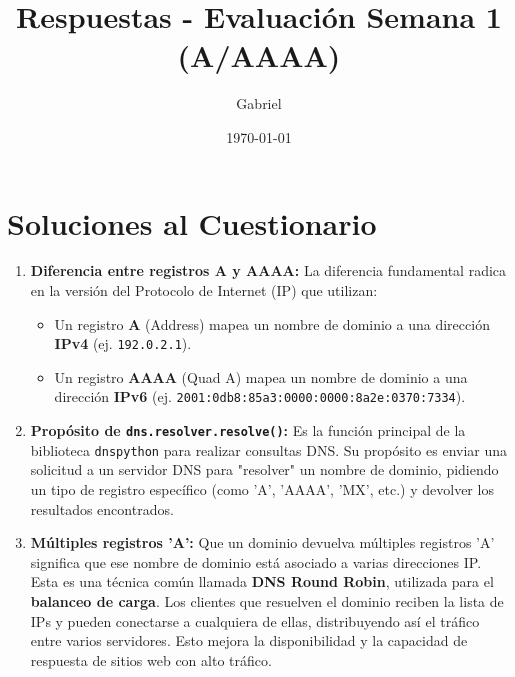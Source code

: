 \documentclass{article}
\title{Respuestas - Evaluación Semana 1 (A/AAAA)}
\author{Gabriel}
\date{\today}
\begin{document}
\maketitle

\section*{Soluciones al Cuestionario}

\begin{enumerate}
    \item \textbf{Diferencia entre registros A y AAAA:}
    La diferencia fundamental radica en la versión del Protocolo de Internet (IP) que utilizan:
    \begin{itemize}
        \item Un registro \textbf{A} (Address) mapea un nombre de dominio a una dirección \textbf{IPv4} (ej. \texttt{192.0.2.1}).
        \item Un registro \textbf{AAAA} (Quad A) mapea un nombre de dominio a una dirección \textbf{IPv6} (ej. \texttt{2001:0db8:85a3:0000:0000:8a2e:0370:7334}).
    \end{itemize}

    \item \textbf{Propósito de \texttt{dns.resolver.resolve()}:}
    Es la función principal de la biblioteca \texttt{dnspython} para realizar consultas DNS. Su propósito es enviar una solicitud a un servidor DNS para "resolver" un nombre de dominio, pidiendo un tipo de registro específico (como 'A', 'AAAA', 'MX', etc.) y devolver los resultados encontrados.

    \item \textbf{Múltiples registros 'A':}
    Que un dominio devuelva múltiples registros 'A' significa que ese nombre de dominio está asociado a varias direcciones IP. Esta es una técnica común llamada \textbf{DNS Round Robin}, utilizada para el \textbf{balanceo de carga}. Los clientes que resuelven el dominio reciben la lista de IPs y pueden conectarse a cualquiera de ellas, distribuyendo así el tráfico entre varios servidores. Esto mejora la disponibilidad y la capacidad de respuesta de sitios web con alto tráfico.

\end{enumerate}
\end{document}
